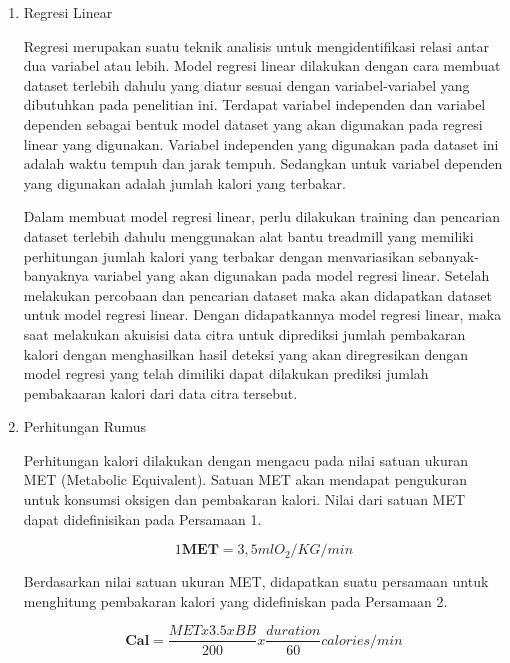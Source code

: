 \begin{enumerate}
  \item Regresi Linear
  
  Regresi merupakan suatu teknik analisis untuk mengidentifikasi relasi antar dua variabel atau lebih. Model regresi linear dilakukan dengan cara membuat dataset terlebih dahulu yang diatur sesuai dengan variabel-variabel yang dibutuhkan pada penelitian ini. Terdapat variabel independen dan variabel dependen sebagai bentuk model dataset yang akan digunakan pada regresi linear yang digunakan. Variabel independen yang digunakan pada dataset ini adalah waktu tempuh dan jarak tempuh. Sedangkan untuk variabel dependen yang digunakan adalah jumlah kalori yang terbakar.
  
  Dalam membuat model regresi linear, perlu dilakukan training dan pencarian dataset terlebih dahulu menggunakan alat bantu treadmill yang memiliki perhitungan jumlah kalori yang terbakar dengan menvariasikan sebanyak-banyaknya variabel yang akan digunakan pada model regresi linear. Setelah melakukan percobaan dan pencarian dataset maka akan didapatkan dataset untuk model regresi linear. Dengan didapatkannya model regresi linear, maka saat melakukan akuisisi data citra untuk diprediksi jumlah pembakaran kalori dengan menghasilkan hasil deteksi yang akan diregresikan dengan model regresi yang telah dimiliki dapat dilakukan prediksi jumlah pembakaaran kalori dari data citra tersebut.

  \item 
  
  Perhitungan Rumus 

  Perhitungan kalori dilakukan dengan mengacu pada nilai satuan ukuran MET (Metabolic Equivalent). Satuan MET akan mendapat pengukuran untuk konsumsi oksigen dan pembakaran kalori. Nilai dari satuan MET dapat didefinisikan pada Persamaan 1.

  \begin{equation}
    \label{eq:SatuanMET}
    1 \mathbf{MET} = 3,5 ml O_2  / KG / min
  \end{equation}

  Berdasarkan nilai satuan ukuran MET, didapatkan suatu persamaan untuk menghitung pembakaran kalori yang didefiniskan pada Persamaan 2.

  \begin{equation}
    \label{eq:RumusKalori}
    \mathbf{Cal} = \frac{MET  x 3.5 x BB}{200} x \frac{duration}{60} calories / min
  \end{equation}


\end{enumerate}
